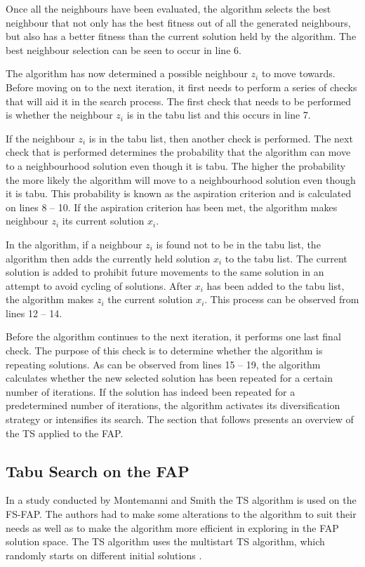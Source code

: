 Once all the neighbours have been evaluated, the algorithm selects the best neighbour that not only has the best fitness out of all the generated neighbours, but also has a better fitness than the current solution held by the algorithm. The best neighbour selection can be seen to occur in line 6.

The algorithm has now determined a possible neighbour $z_i$ to move towards. Before moving on to the next iteration, it first needs to perform a series of checks that will aid it in the search process. The first check that needs to be performed is whether the neighbour $z_i$ is in the tabu list and this occurs in line 7. 

If the neighbour $z_i$ is in the tabu list, then another check is performed. The next check that is performed determines the probability that the algorithm can move to a neighbourhood solution even though it is tabu. The higher the probability the more likely the algorithm will move to a neighbourhood solution even though it is tabu. This probability is known as the aspiration criterion and is calculated on lines 8 -- 10. If the aspiration criterion has been met, the algorithm makes neighbour $z_i$ its current solution $x_i$.

In the algorithm, if a neighbour $z_i$ is found not to be in the tabu list, the algorithm then adds the currently held solution $x_i$ to the tabu list. The current solution is added to prohibit future movements to the same solution in an attempt to avoid cycling of solutions. After $x_i$ has been added to the tabu list, the algorithm makes $z_i$ the current solution $x_i$. This process can be observed from lines 12 -- 14.

Before the algorithm continues to the next iteration, it performs one last final check. The purpose of this check is to determine whether the algorithm is repeating solutions. As can be observed from lines 15 -- 19, the algorithm calculates whether the new selected solution has been repeated for a certain number of iterations. If the solution has indeed been repeated for a predetermined number of iterations, the algorithm activates its diversification strategy or intensifies its search.
The section that follows presents an overview of the \gls{TS} applied to the \gls{FAP}.
\subsection{Tabu Search on the \gls{FAP}}
\label{sec:tabuonfap}
In a study conducted by Montemanni and Smith \cite{TabuMontemanniSmith} the \gls{TS} algorithm is used on the \gls{FS-FAP}. The authors had to make some alterations to the algorithm to suit their needs as well as to make the algorithm more efficient in exploring in the \gls{FAP} solution space. The \gls{TS} algorithm uses the multistart \gls{TS} algorithm, which randomly starts on different initial solutions \cite{TabuMontemanniSmith}.

